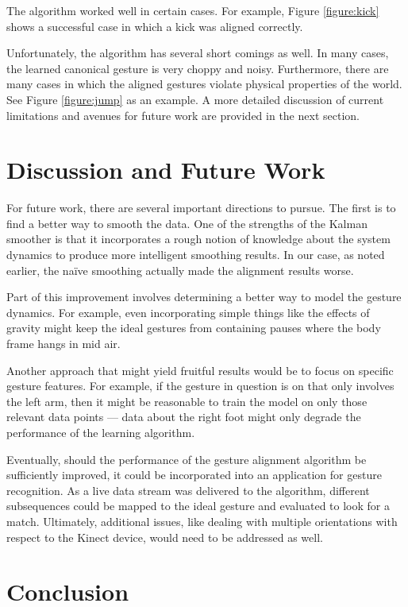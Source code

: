 \documentclass{article}
\begin{document}
The algorithm worked well in certain cases. For example, Figure
\ref{figure:kick} shows a successful case in which a kick was aligned correctly.


Unfortunately, the algorithm has several short comings as well. In many cases,
the learned canonical gesture is very choppy and noisy. Furthermore, there are
many cases in which the aligned gestures violate physical properties of the
world. See Figure \ref{figure:jump} as an example. A more detailed discussion of
current limitations and avenues for future work are provided in the next
section.




\section{Discussion and Future Work}

For future work, there are several important directions to pursue. The first is to
find a better way to smooth the data. One of the strengths of the Kalman
smoother is that it incorporates a rough notion of knowledge about the
system dynamics to produce more intelligent smoothing results. In our case,
as noted earlier, the na\"ive smoothing actually made the alignment results
worse.

Part of this improvement involves determining a better way to model the gesture
dynamics. For example, even incorporating simple things like the effects of gravity
might keep the ideal gestures from containing pauses where the body frame
hangs in mid air.

Another approach that might yield fruitful results would be to focus on specific
gesture features. For example, if the gesture in question is on that only involves the
left arm, then it might be reasonable to train the model on only those relevant
data points --- data about the right foot might only degrade the performance of the
learning algorithm.

Eventually, should the performance of the gesture alignment algorithm be
sufficiently improved, it could be incorporated into an application for gesture
recognition. As a live data stream was delivered to the algorithm, different
subsequences could be mapped to the ideal gesture and evaluated to look
for a match. Ultimately, additional issues, like dealing with multiple orientations with
respect to the Kinect device, would need to be addressed as well.

\section{Conclusion}
\end{document}
